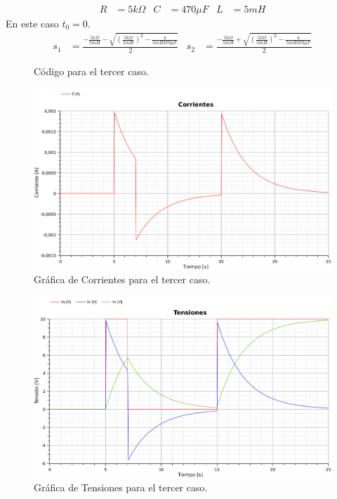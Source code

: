 

\begin{align*}
  R&=5k\Omega&
  C&=470\mu F&
  L&=5mH
\end{align*}
En este caso $t_0=0$.
\begin{align*}
  s_1 &= \frac{-\frac{5k\Omega}{5mH}
  - \sqrt{\left(\frac{5k\Omega}{5mH}\right)^2-\frac{4}{5mH470\mu F}}}{2}
  &
  s_2 &= \frac{-\frac{5k\Omega}{5mH}
  + \sqrt{\left(\frac{5k\Omega}{5mH}\right)^2-\frac{4}{5mH470\mu F}}}{2}
\end{align*}


\begin{figure}[H]
  
  \caption{Código para el tercer caso.}
\end{figure}

\begin{figure}[H]
  \centering
  \label{gr:caso1:corrientes}
  \includegraphics[width=\textwidth]{modelica/graficas/3-corrientes}
  \caption{Gráfica de Corrientes para el tercer caso.}
\end{figure}

\begin{figure}[H]
  \centering
  \label{gr:caso1:tensiones}
  \includegraphics[width=\textwidth]{modelica/graficas/3-tensiones}
  \caption{Gráfica de Tensiones para el tercer caso.}
\end{figure}
